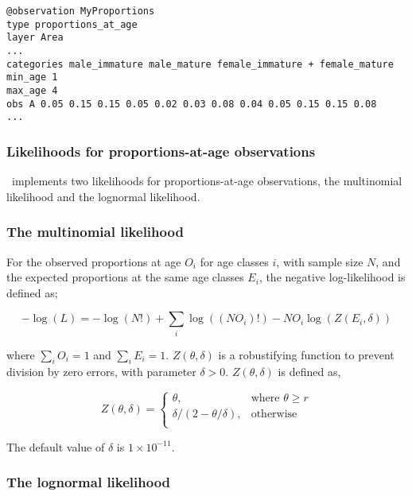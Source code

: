 {{{{{{{\small{\begin{verbatim}
@observation MyProportions
type proportions_at_age
layer Area
...
categories male_immature male_mature female_immature + female_mature
min_age 1
max_age 4
obs A 0.05 0.15 0.15 0.05 0.02 0.03 0.08 0.04 0.05 0.15 0.15 0.08
...
\end{verbatim}}}

\subsubsection{Likelihoods for proportions-at-age observations}

\SPM\ implements two likelihoods for proportions-at-age observations, the multinomial likelihood and the lognormal likelihood. 

\subsubsection*{The multinomial likelihood}

For the observed proportions at age $O_i$ for age classes $i$, with sample size $N$, and the expected proportions at the same age classes $E_i$, the negative log-likelihood is defined as; 

\begin{equation}
  -\log \left(L \right) =  -\log \left(N! \right) + \sum\limits_i \log \left( \left(NO_i \right)! \right) - NO_i \log \left(Z \left(E_i,\delta \right) \right)
\end{equation}

where $\sum\limits_i O_i = 1$ and $\sum\limits_i E_i = 1$. $Z \left(\theta,\delta \right)$ is a robustifying function to prevent division by zero errors, with parameter $\delta>0$. $Z \left(\theta,\delta \right)$ is defined as,

\begin{equation}
   Z \left(\theta,\delta \right) = \begin{cases}
	  \theta, & \text{where $\theta \ge r$} \\
	  \delta/\left( 2-\theta/\delta \right), & \text{otherwise} \\  
  \end{cases}
\end{equation}

The default value of $\delta$ is $1 \times 10^{-11}$.

\subsubsection*{The lognormal likelihood}

}}}}}}
